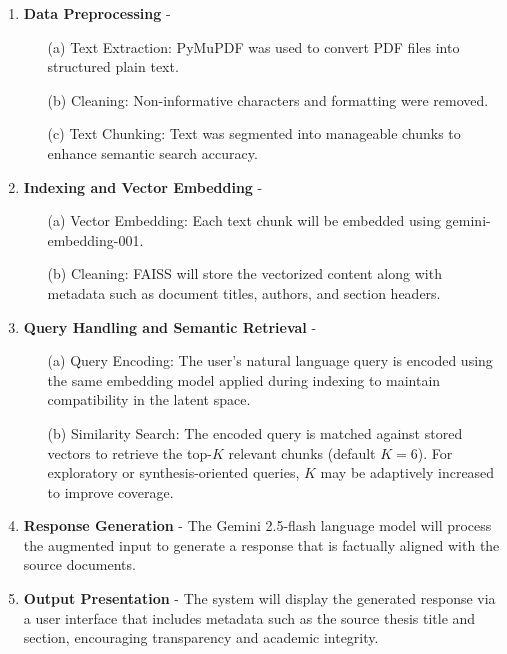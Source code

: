 \begin{refsection}
\begin{enumerate}
    \item \textbf{Data Preprocessing} - 
        \begin{enumerate}
            \item [(a)] {Text Extraction:} PyMuPDF was used to convert PDF files into structured plain text.
            \item [(b)] {Cleaning:} Non-informative characters and formatting were removed.
            \item [(c)] {Text Chunking:} Text was segmented into manageable chunks to enhance semantic search accuracy.
        \end{enumerate}
        
    \item \textbf{Indexing and Vector Embedding} - 
        \begin{enumerate}
            \item [(a)] {Vector Embedding:} Each text chunk will be embedded using gemini-embedding-001.
            \item [(b)] {Cleaning:} FAISS will store the vectorized content along with metadata such as document titles, authors, and section headers.
        \end{enumerate}

    \item \textbf{Query Handling and Semantic Retrieval} - 
        \begin{enumerate}
            \item [(a)] {Query Encoding:} The user’s natural language query is encoded using the same embedding model applied during indexing to maintain compatibility in the latent space.
            \item [(b)] {Similarity Search:} The encoded query is matched against stored vectors to retrieve the top-$K$ relevant chunks (default $K=6$). For exploratory or synthesis-oriented queries, $K$ may be adaptively increased to improve coverage.
        \end{enumerate}

    \item \textbf{Response Generation} - The Gemini 2.5-flash language model will process the augmented input to generate a response that is factually aligned with the source documents.

    \item \textbf{Output Presentation} - The system will display the generated response via a user interface that includes metadata such as the source thesis title and section, encouraging transparency and academic integrity.


\end{enumerate}
\end{refsection}
